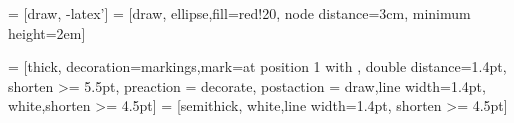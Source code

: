  = [draw, -latex']
 = [draw, ellipse,fill=red!20, node distance=3cm,    minimum height=2em]

 = [thick, decoration={markings,mark=at position
   1 with {}},
   double distance=1.4pt, shorten >= 5.5pt,
   preaction = {decorate},
   postaction = {draw,line width=1.4pt, white,shorten >= 4.5pt}]
 = [semithick, white,line width=1.4pt, shorten >= 4.5pt]





